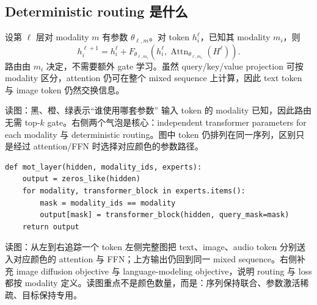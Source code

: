 \subsection{Deterministic routing 是什么}

设第 $\ell$ 层对 modality $m$ 有参数 $\theta_{\ell,m}$。对 token $h_i^\ell$，已知其 modality $m_i$，则
$$
h_i^{\ell+1}
=h_i^\ell+F_{\theta_{\ell,m_i}}
\left(h_i^\ell,\operatorname{Attn}_{\theta_{\ell,m_i}}(H^\ell)\right).
$$
路由由 $m_i$ 决定，不需要额外 gate 学习。虽然 query/key/value projection 可按 modality 区分，attention 仍可在整个 mixed sequence 上计算，因此 text token 与 image token 仍然交换信息。


\begin{knowledgebox}{读图：黑、橙、绿表示“谁使用哪套参数”}
输入 token 的 modality 已知，因此路由无需 top-$k$ gate。右侧两个气泡是核心：independent transformer parameters for each modality 与 deterministic routing。图中 token 仍排列在同一序列，区别只是经过 attention/FFN 时选择对应颜色的参数路径。
\end{knowledgebox}

\begin{lstlisting}[caption={MoT 的 deterministic modality routing}]
def mot_layer(hidden, modality_ids, experts):
    output = zeros_like(hidden)
    for modality, transformer_block in experts.items():
        mask = modality_ids == modality
        output[mask] = transformer_block(hidden, query_mask=mask)
    return output
\end{lstlisting}


\begin{knowledgebox}{读图：从左到右追踪一个 token}
左侧完整图把 text、image、audio token 分别送入对应颜色的 attention 与 FFN；上方输出仍回到同一 mixed sequence。右侧补充 image diffusion objective 与 language-modeling objective，说明 routing 与 loss 都按 modality 定义。读图重点不是颜色数量，而是：序列保持联合、参数激活稀疏、目标保持专用。
\end{knowledgebox}



